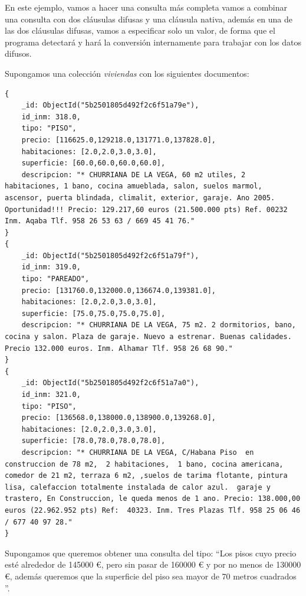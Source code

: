 \begin{example}
En este ejemplo, vamos a hacer una consulta más completa vamos a combinar una consulta con dos cláusulas difusas y una cláusula nativa, además en una de las dos cláusulas difusas, vamos a especificar solo un valor, de forma que el programa detectará y hará la conversión internamente para trabajar con los datos difusos.

Supongamos una colección \textit{viviendas} con los siguientes documentos:
\begin{lstlisting}[numbers=none]
{
    _id: ObjectId("5b2501805d492f2c6f51a79e"),
    id_inm: 318.0,
    tipo: "PISO",
    precio: [116625.0,129218.0,131771.0,137828.0],
    habitaciones: [2.0,2.0,3.0,3.0],
    superficie: [60.0,60.0,60.0,60.0],
    descripcion: "* CHURRIANA DE LA VEGA, 60 m2 utiles, 2 habitaciones, 1 bano, cocina amueblada, salon, suelos marmol, ascensor, puerta blindada, climalit, exterior, garaje. Ano 2005. Oportunidad!!! Precio: 129.217,60 euros (21.500.000 pts) Ref. 00232 Inm. Aqaba Tlf. 958 26 53 63 / 669 45 41 76."
}
{
    _id: ObjectId("5b2501805d492f2c6f51a79f"),
    id_inm: 319.0,
    tipo: "PAREADO",
    precio: [131760.0,132000.0,136674.0,139381.0],
    habitaciones: [2.0,2.0,3.0,3.0],
    superficie: [75.0,75.0,75.0,75.0],
    descripcion: "* CHURRIANA DE LA VEGA, 75 m2. 2 dormitorios, bano, cocina y salon. Plaza de garaje. Nuevo a estrenar. Buenas calidades. Precio 132.000 euros. Inm. Alhamar Tlf. 958 26 68 90."
}
{
    _id: ObjectId("5b2501805d492f2c6f51a7a0"),
    id_inm: 321.0,
    tipo: "PISO",
    precio: [136568.0,138000.0,138900.0,139268.0],
    habitaciones: [2.0,2.0,3.0,3.0],
    superficie: [78.0,78.0,78.0,78.0],
    descripcion: "* CHURRIANA DE LA VEGA, C/Habana Piso  en construccion de 78 m2,  2 habitaciones,  1 bano, cocina americana, comedor de 21 m2, terraza 6 m2, ,suelos de tarima flotante, pintura lisa, calefaccion totalmente instalada de calor azul.  garaje y trastero, En Construccion, le queda menos de 1 ano. Precio: 138.000,00 euros (22.962.952 pts) Ref:  40323. Inm. Tres Plazas Tlf. 958 25 06 46 / 677 40 97 28."
}
\end{lstlisting}

Supongamos que queremos obtener una consulta del tipo: ``Los pisos cuyo precio esté alrededor de 145000 €, pero sin pasar de 160000 € y por no menos de 130000 €, además queremos que la superficie del piso sea mayor de 70 metros cuadrados ''.


\end{example}
